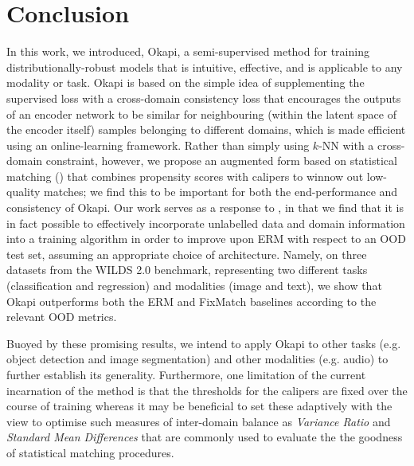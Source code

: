 \section{Conclusion}\label{sec:okapi-conclusion}
In this work, we introduced, Okapi, a semi-supervised method for training distributionally-robust
models that is intuitive, effective, and is applicable to any modality or task.
%
Okapi is based on the simple idea of supplementing the supervised loss with a cross-domain
consistency loss that encourages the outputs of an encoder network to be similar for neighbouring
(within the latent space of the encoder itself) samples  belonging to different domains, which is
made efficient using an online-learning framework.
%
Rather than simply using $k$-NN with a cross-domain constraint, however, we propose an augmented
form based on statistical matching (\CNN) that combines propensity scores with calipers to winnow
out low-quality matches; we find this to be important for both the end-performance and consistency
of Okapi.
%
Our work serves as a response to \cite{SagWeiLeeGaoetal22}, in that we find that it is in fact
possible to effectively incorporate unlabelled data and domain information into a training
algorithm in order to improve upon ERM with respect to an OOD test set, assuming an appropriate
choice of architecture.
%
Namely, on three datasets from the WILDS 2.0 benchmark, representing two different tasks
(classification and regression) and modalities (image and text), we show that Okapi outperforms
both the ERM and FixMatch baselines according to the relevant OOD metrics.
%

Buoyed by these promising results, we intend to apply Okapi to other tasks (e.g. object detection
and image segmentation) and other modalities (e.g. audio) to further establish its generality.
%
Furthermore, one limitation of the current incarnation of the method is that the thresholds for the
calipers are fixed over the course of training whereas it may be beneficial to set these adaptively
with the view to optimise such measures of inter-domain balance as \emph{Variance Ratio} and
\emph{Standard Mean Differences} that are commonly used to evaluate the the goodness of statistical
matching procedures.
